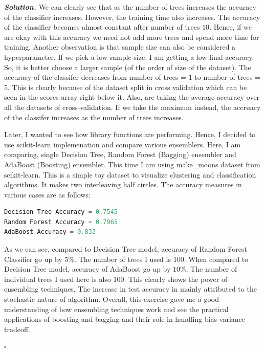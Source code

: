 \documentclass[12pt]{article}
\newenvironment{solution}[1][\it{Solution}]{\textbf{#1. } }{$\square$}
\begin{document}
\begin{solution}
We can clearly see that as the number of trees increases the accuracy of the classifier increases. However, the training time also increases. The accuracy of the classifier becomes almost constant after number of trees $10$. Hence, if we are okay with this accuracy we need not add more trees and spend more time for training. Another observation is that sample size can also be considered a  hyperparameter. If we pick a low sample size, I am getting a low final accuracy. So, it is better choose a larger sample (of the order of size of the dataset). The accuracy of the classifer decreases from number of trees = $1$ to number of trees = $5$. This is clearly because of the dataset split in cross validation which can be seen in the scores array right below it. Also, are taking the average accuracy over all the datasets of cross-validation. If we take the maximum instead, the accruacy 
of the classifer increases as the number of trees increases.

Later, I wanted to see how library functions are performing. Hence, I decided to use scikit-learn implemenation and compare various ensemblers. Here, I am comparing, single Decision Tree, Random Forest (Bagging) ensembler and AdaBoost (Boosting) ensembler. This time I am using make\_moons\cite{moons} dataset from scikit-learn. This is a simple toy dataset to visualize clustering and classification algorithms. It makes two interleaving half circles. The accuracy measures in various cases are as follows:

\begin{lstlisting}[language=Python]
Decision Tree Accuracy = 0.7545
Random Forest Accuracy = 0.7965
AdaBoost Accuracy = 0.833
\end{lstlisting}

As we can see, compared to Decision Tree model, accuracy of Random Forest Classifier go up by $5$\%. The number of trees I used is 100. When compared to Decision Tree model, accuracy of AdaBoost go up by $10$\%. The number of individual trees I used here is also 100. This clearly shows the power of ensembling techniques. The increase in test accuracy in mainly attributed to the stochastic nature of algorithm. Overall, this exercise gave me a good understanding of how ensembling techniques work and see the practical applications of boosting and bagging and their role in handling bias-variance tradeoff.

\end{solution} 

\medskip
\end{document}
